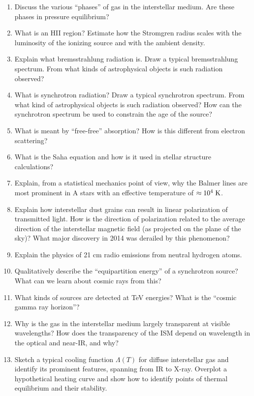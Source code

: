 \documentclass[11pt, oneside]{book}
\begin{document}
\begin{enumerate}[start=72, itemsep=0.4cm]
    \item Discuss the various ``phases'' of gas in the interstellar medium. Are these phases in pressure equilibrium?
    \item What is an HII region? Estimate how the Stromgren radius scales with the luminosity of the ionizing source and with the ambient density.
    \item Explain what bremsstrahlung radiation is. Draw a typical bremsstrahlung spectrum. From what kinds of astrophysical objects is such radiation observed?
    \item What is synchrotron radiation? Draw a typical synchrotron spectrum. From what kind of astrophysical objects is such radiation observed? How can the synchrotron spectrum be used to constrain the age of the source?
    \item What is meant by ``free-free'' absorption? How is this different from electron scattering?
    \item What is the Saha equation and how is it used in stellar structure calculations?
    \item Explain, from a statistical mechanics point of view, why the Balmer lines are most prominent in A stars with an effective temperature of $\approx 10^{4} \; {\rm K}$.
    \item Explain how interstellar dust grains can result in linear polarization of transmitted light. How is the direction of polarization related to the average direction of the interstellar magnetic field (as projected on the plane of the sky)? What major discovery in 2014 was derailed by this phenomenon?
    \item Explain the physics of 21 cm radio emissions from neutral hydrogen atoms.
    \item Qualitatively describe the ``equipartition energy'' of a synchrotron source? What can we learn about cosmic rays from this?
    \item What kinds of sources are detected at TeV energies? What is the ``cosmic gamma ray horizon''?
    \item Why is the gas in the interstellar medium largely transparent at visible wavelengths? How does the transparency of the ISM depend on wavelength in the optical and near-IR, and why?
    \item Sketch a typical cooling function $\Lambda(T)$ for diffuse interstellar gas and identify its prominent features, spanning from IR to X-ray. Overplot a hypothetical heating curve and show how to identify points of thermal equilibrium and their stability.

\end{enumerate}
\end{document}
